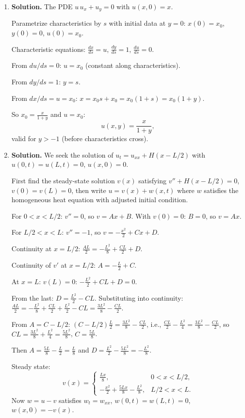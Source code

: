 \begin{enumerate}
\item \textbf{Solution.}
The PDE $u\,u_x+u_y=0$ with $u(x,0)=x$.

Parametrize characteristics by $s$ with initial data at $y=0$: $x(0)=x_0$, $y(0)=0$, $u(0)=x_0$.

Characteristic equations: $\frac{dx}{ds}=u$, $\frac{dy}{ds}=1$, $\frac{du}{ds}=0$.

From $du/ds=0$: $u=x_0$ (constant along characteristics).

From $dy/ds=1$: $y=s$.

From $dx/ds=u=x_0$: $x=x_0 s+x_0=x_0(1+s)=x_0(1+y)$.

So $x_0=\frac{x}{1+y}$ and $u=x_0$:
\[
\boxed{u(x,y)=\frac{x}{1+y}},
\]
valid for $y>-1$ (before characteristics cross).

\item \textbf{Solution.}
We seek the solution of $u_t=u_{xx}+H(x-L/2)$ with $u(0,t)=u(L,t)=0$, $u(x,0)=0$.

First find the steady-state solution $v(x)$ satisfying $v''+H(x-L/2)=0$, $v(0)=v(L)=0$, then write $u=v(x)+w(x,t)$ where $w$ satisfies the homogeneous heat equation with adjusted initial condition.

For $0<x<L/2$: $v''=0$, so $v=Ax+B$. With $v(0)=0$: $B=0$, so $v=Ax$.

For $L/2<x<L$: $v''=-1$, so $v=-\frac{x^2}{2}+Cx+D$.

Continuity at $x=L/2$: $\frac{AL}{2}=-\frac{L^2}{8}+\frac{CL}{2}+D$.

Continuity of $v'$ at $x=L/2$: $A=-\frac{L}{2}+C$.

At $x=L$: $v(L)=0$: $-\frac{L^2}{2}+CL+D=0$.

From the last: $D=\frac{L^2}{2}-CL$. Substituting into continuity: $\frac{AL}{2}=-\frac{L^2}{8}+\frac{CL}{2}+\frac{L^2}{2}-CL = \frac{3L^2}{8}-\frac{CL}{2}$.

From $A=C-L/2$: $(C-L/2)\frac{L}{2}=\frac{3L^2}{8}-\frac{CL}{2}$, i.e., $\frac{CL}{2}-\frac{L^2}{4}=\frac{3L^2}{8}-\frac{CL}{2}$, so $CL=\frac{3L^2}{8}+\frac{L^2}{4}=\frac{5L^2}{8}$, $C=\frac{5L}{8}$.

Then $A=\frac{5L}{8}-\frac{L}{2}=\frac{L}{8}$ and $D=\frac{L^2}{2}-\frac{5L^2}{8}=-\frac{L^2}{8}$.

Steady state:
\[
v(x)=\begin{cases}\frac{Lx}{8}, & 0<x<L/2,\\[4pt] -\frac{x^2}{2}+\frac{5Lx}{8}-\frac{L^2}{8}, & L/2<x<L.\end{cases}
\]
Now $w=u-v$ satisfies $w_t=w_{xx}$, $w(0,t)=w(L,t)=0$, $w(x,0)=-v(x)$.


\end{enumerate}
